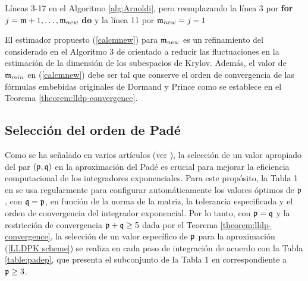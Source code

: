 \begin{algorithm}[!htb]
	\caption{Algoritmo de Arnoldi para expandir la base ortonormal $\{v_1,\ldots,v_{\mf} \}$ del $\mf$-ésimo subespacio de Krylov $\mathcal{K}_{\mf}(A,b)=span\{b,Ab,\ldots,A^{\mf-1}b\}$ a la base ortonormal $\{v_1,\ldots,v_{\mf},\ldots,v_{\mf_{new}} \}$ del $\mf_{new}$-ésimo subespacio de Krylov ${\mathcal{K}_{\mf_{new}}(A,b)=span\{b,Ab,\ldots,A^{\mf_{new}-1}b\}}$}
    \label{alg:Arnoldiexpand}
	Líneas 3-17 en el Algoritmo \ref{alg:Arnoldi}, pero reemplazando la línea 3 por \textbf{for} $j=\mathfrak{m}+1,\ldots,\mathfrak{m}_{new}$ \textbf{do} y la línea 11 por $\mathfrak{m}_{new}=j-1$
\end{algorithm}
El estimador propuesto (\ref{calcmnew}) para $\mf_{new}$ es un refinamiento del considerado en el Algoritmo 3 de \cite{niesen2012algorithm} orientado a reducir las fluctuaciones en la estimación de la dimensión de los subespacios de Krylov. Además, el valor de $\mathfrak{m}_{min}$ en (\ref{calcmnew}) debe ser tal que conserve el orden de convergencia de las fórmulas embebidas originales de Dormand y Prince como se establece en el Teorema \ref{theorem:lldp-convergence}.

\subsection{Selección del orden de Padé}\label{sec:pade-order}
Como se ha señalado en varios artículos (ver \cite{jimenez2009rate,jimenez2012convergence, Jimenez14AMC, jimenez2015convergence}), la selección de un valor apropiado del par $(\mathfrak{p},\mathfrak{q})$ en la aproximación del Padé es crucial para mejorar la eficiencia computacional de los integradores exponenciales. Para este propósito, la Tabla 1 en \cite{moler2003nineteen} se usa regularmente para configurar automáticamente los valores óptimos de $\mathfrak{p}$, con $\mathfrak{q}=\mathfrak{p}$, en función de la norma de la matriz, la tolerancia especificada y el orden de convergencia del integrador exponencial. Por lo tanto, con $\mathfrak{p}=\mathfrak{q}$ y la restricción de convergencia $\mathfrak{p}+\mathfrak{q}\geq5$ dada por el Teorema \ref{theorem:lldp-convergence}, la selección de un valor específico de $\mathfrak{p}$ para la aproximación (\ref{LLDPK scheme}) se realiza en cada paso de integración de acuerdo con la Tabla \ref{table:padep}, que presenta el subconjunto de la Tabla 1 en \cite{moler2003nineteen} correspondiente a $\mathfrak{p} \ge 3$.
\vspace{0.2cm}

